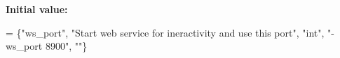 {\bfseries Initial value\+:}
\begin{DoxyCode}
= 
        \{\textcolor{stringliteral}{"ws\_port"}, \textcolor{stringliteral}{"Start web service for ineractivity and use this port"}, \textcolor{stringliteral}{"int"}, \textcolor{stringliteral}{"-ws\_port 8900"}, \textcolor{stringliteral}{""}\}
\end{DoxyCode}
